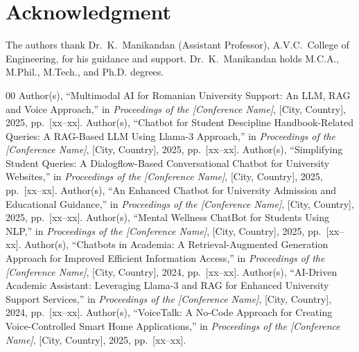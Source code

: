 ﻿\documentclass[conference]{IEEEtran}
\begin{document}
\section*{Acknowledgment}
The authors thank Dr.\ K.\ Manikandan (Assistant Professor), A.V.C.\ College of Engineering, for his guidance and support. Dr.\ K.\ Manikandan holds M.C.A., M.Phil., M.Tech., and Ph.D. degrees.

\begin{thebibliography}{00}
 Author(s), ``Multimodal AI for Romanian University Support: An LLM, RAG and Voice Approach,'' in \emph{Proceedings of the [Conference Name]}, [City, Country], 2025, pp.~[xx--xx].
 Author(s), ``Chatbot for Student Descipline Handbook-Related Queries: A RAG-Based LLM Using Llama-3 Approach,'' in \emph{Proceedings of the [Conference Name]}, [City, Country], 2025, pp.~[xx--xx].
 Author(s), ``Simplifying Student Queries: A Dialogflow-Based Conversational Chatbot for University Websites,'' in \emph{Proceedings of the [Conference Name]}, [City, Country], 2025, pp.~[xx--xx].
 Author(s), ``An Enhanced Chatbot for University Admission and Educational Guidance,'' in \emph{Proceedings of the [Conference Name]}, [City, Country], 2025, pp.~[xx--xx].
 Author(s), ``Mental Wellness ChatBot for Students Using NLP,'' in \emph{Proceedings of the [Conference Name]}, [City, Country], 2025, pp.~[xx--xx].
 Author(s), ``Chatbots in Academia: A Retrieval-Augmented Generation Approach for Improved Efficient Information Access,'' in \emph{Proceedings of the [Conference Name]}, [City, Country], 2024, pp.~[xx--xx].
 Author(s), ``AI-Driven Academic Assistant: Leveraging Llama-3 and RAG for Enhanced University Support Services,'' in \emph{Proceedings of the [Conference Name]}, [City, Country], 2024, pp.~[xx--xx].
 Author(s), ``VoiceTalk: A No-Code Approach for Creating Voice-Controlled Smart Home Applications,'' in \emph{Proceedings of the [Conference Name]}, [City, Country], 2025, pp.~[xx--xx].
\end{thebibliography}
\end{document}
